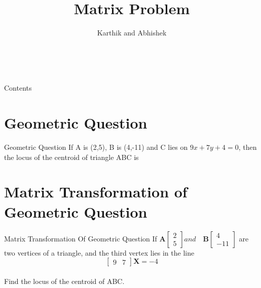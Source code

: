 \documentclass{beamer}
\title{Matrix Problem}
\author{Karthik and Abhishek}
\institute{IIT Hyderabad}
\begin{document}
\begin{frame}
\titlepage   
\ 
\end{frame}
\begin{frame}{Contents}
\tableofcontents
\end{frame}
\section{Geometric Question}
\begin{frame}{Geometric Question}
If A is (2,5), B is (4,-11) and C lies on $9x + 7y + 4 = 0$, then the locus of the centroid of triangle ABC is
\end{frame}
\section{Matrix Transformation of Geometric Question}
\begin{frame}{Matrix Transformation Of Geometric Question}
If $\textbf{A}\begin{bmatrix}2 \\ 5\end{bmatrix} and\quad \textbf{B}\begin{bmatrix}4 \\ -11\end{bmatrix}$ are two vertices of a triangle, and the third vertex lies in the line
\\\[\begin{bmatrix}9 & 7\end{bmatrix}\textbf{X} = -4\]
\\Find the locus of the centroid of ABC.
\end{frame}
\end{document}
